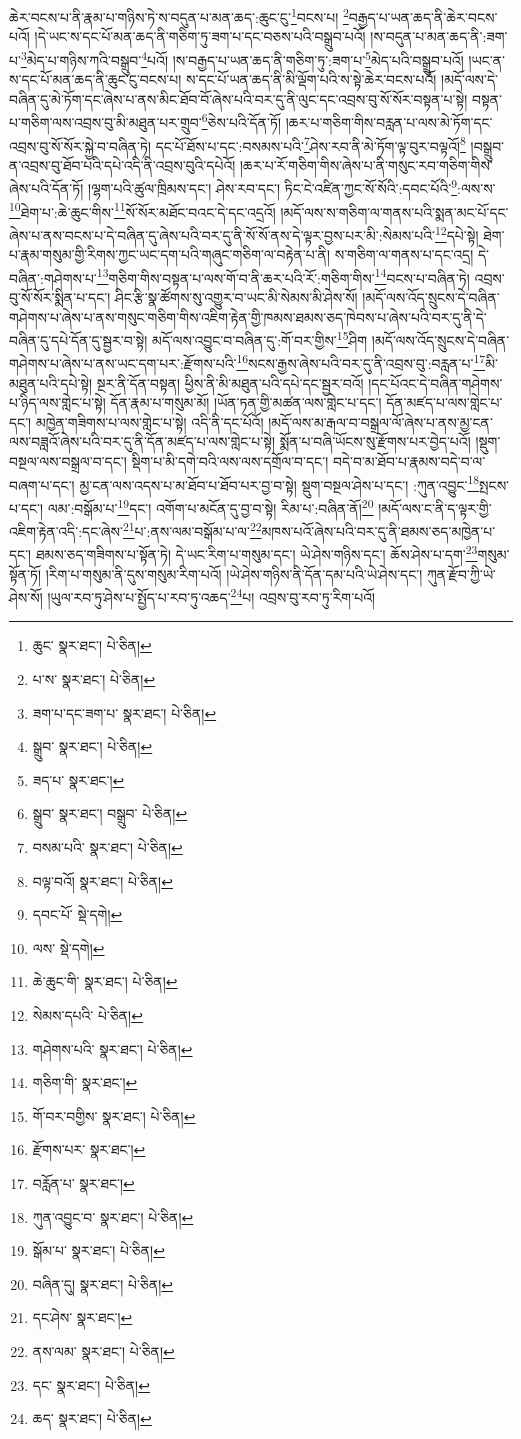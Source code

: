 ཆེར་བངས་པ་ནི་རྣམ་པ་གཉིས་ཏེ་ས་བདུན་པ་མན་ཆད་:ཆུང་ངུ་\footnote{ཆུང་  སྣར་ཐང་།  པེ་ཅིན། }བངས་པ། \footnote{པ་ས་  སྣར་ཐང་།  པེ་ཅིན། }བརྒྱད་པ་ཡན་ཆད་ནི་ཆེར་བངས་པའོ། །དེ་ཡང་ས་དང་པོ་མན་ཆད་ནི་གཅིག་ཏུ་ཟག་པ་དང་བཅས་པའི་བསྒྲུབ་པའོ། །ས་བདུན་པ་མན་ཆད་ནི་:ཟག་པ་\footnote{ཟག་པ་དང་ཟག་པ་  སྣར་ཐང་།  པེ་ཅིན། }མེད་པ་གཉིས་ཀའི་བསྒྲུབ་\footnote{སྒྲུབ་  སྣར་ཐང་།  པེ་ཅིན། }པའོ། །ས་བརྒྱད་པ་ཡན་ཆད་ནི་གཅིག་ཏུ་:ཟག་པ་\footnote{ཟད་པ་  སྣར་ཐང་། }མེད་པའི་བསྒྲུབ་པའོ། །ཡང་ན་ས་དང་པོ་མན་ཆད་ནི་ཆུང་ངུ་བངས་པ། ས་དང་པོ་ཡན་ཆད་ནི་མི་ལྡོག་པའི་ས་སྟེ་ཆེར་བངས་པའོ། །མདོ་ལས་དེ་བཞིན་དུ་མེ་ཏོག་དང་ཞེས་པ་ནས་མིང་ཐོབ་བོ་ཞེས་པའི་བར་དུ་ནི་ལུང་དང་འབྲས་བུ་སོ་སོར་བསྟན་པ་སྟེ། བསྟན་པ་གཅིག་ལས་འབྲས་བུ་མི་མཐུན་པར་གྲུབ་\footnote{སྒྲུབ་  སྣར་ཐང་། བསྒྲུབ་  པེ་ཅིན། }ཅེས་པའི་དོན་ཏོ། །ཆར་པ་གཅིག་གིས་བརླན་པ་ལས་མེ་ཏོག་དང་འབྲས་བུ་སོ་སོར་སྐྱེ་བ་བཞིན་ཏེ། དང་པོ་ཐོས་པ་དང་:བསམས་པའི་\footnote{བསམ་པའི་  སྣར་ཐང་།  པེ་ཅིན། }ཤེས་རབ་ནི་མེ་ཏོག་ལྟ་བུར་བལྟའོ།\footnote{བལྟ་བའོ།  སྣར་ཐང་།  པེ་ཅིན། } །བསྒྲུབ་ན་འབྲས་བུ་ཐོབ་པའི་དཔེ་འདི་ནི་འབྲས་བུའི་དཔེའོ། །ཆར་པ་རོ་གཅིག་གིས་ཞེས་པ་ནི་གསུང་རབ་གཅིག་གིས་ཞེས་པའི་དོན་ཏོ། །ལྷག་པའི་ཚུལ་ཁྲིམས་དང་། ཤེས་རབ་དང་། ཏིང་ངེ་འཛིན་ཀྱང་སོ་སོའི་:དབང་པོའི་\footnote{དབང་པོ་  སྡེ་དགེ། }:ལས་ས་\footnote{ལས་  སྡེ་དགེ། }ཐེག་པ་:ཆེ་ཆུང་གིས་\footnote{ཆེ་ཆུང་གི་  སྣར་ཐང་།  པེ་ཅིན། }སོ་སོར་མཐོང་བའང་དེ་དང་འདྲའོ། །མདོ་ལས་ས་གཅིག་ལ་གནས་པའི་སྨན་མང་པོ་དང་ཞེས་པ་ནས་བངས་པ་དེ་བཞིན་དུ་ཞེས་པའི་བར་དུ་ནི་སོ་སོ་ནས་དེ་ལྟར་བྱས་པར་མི་:སེམས་པའི་\footnote{སེམས་དཔའི་  པེ་ཅིན། }དཔེ་སྟེ། ཐེག་པ་རྣམ་གསུམ་གྱི་རིགས་ཀྱང་ཡང་དག་པའི་གཞུང་གཅིག་ལ་བརྟེན་པ་ནི། ས་གཅིག་ལ་གནས་པ་དང་འདྲ། དེ་བཞིན་:གཤེགས་པ་\footnote{གཤེགས་པའི་  སྣར་ཐང་།  པེ་ཅིན། }གཅིག་གིས་བསྟན་པ་ལས་གོ་བ་ནི་ཆར་པའི་རོ་:གཅིག་གིས་\footnote{གཅིག་གི་  སྣར་ཐང་། }བངས་པ་བཞིན་ཏེ། འབྲས་བུ་སོ་སོར་སྨིན་པ་དང་། ཤིང་རྩི་སྣ་ཚོགས་སུ་འགྱུར་བ་ཡང་མི་སེམས་མི་ཤེས་སོ། །མདོ་ལས་འོད་སྲུངས་དེ་བཞིན་གཤེགས་པ་ཞེས་པ་ནས་གསུང་གཅིག་གིས་འཇིག་རྟེན་གྱི་ཁམས་ཐམས་ཅད་ཁེབས་པ་ཞེས་པའི་བར་དུ་ནི་དེ་བཞིན་དུ་དཔེ་དོན་དུ་སྦྱར་བ་སྟེ། མདོ་ལས་འབྱུང་བ་བཞིན་དུ་:གོ་བར་གྱིས་\footnote{གོ་བར་བགྱིས་  སྣར་ཐང་།  པེ་ཅིན། }ཤིག །མདོ་ལས་འོད་སྲུངས་དེ་བཞིན་གཤེགས་པ་ཞེས་པ་ནས་ཡང་དག་པར་:རྫོགས་པའི་\footnote{རྫོགས་པར་  སྣར་ཐང་། }སངས་རྒྱས་ཞེས་པའི་བར་དུ་ནི་འབྲས་བུ་:བརླན་པ་\footnote{བརློན་པ་  སྣར་ཐང་། }མི་མཐུན་པའི་དཔེ་སྟེ། སྔར་ནི་དོན་བསྟན། ཕྱིས་ནི་མི་མཐུན་པའི་དཔེ་དང་སྦྱར་བའོ། །དང་པོའང་དེ་བཞིན་གཤེགས་པ་ཉིད་ལས་གླེང་པ་སྟེ། དོན་རྣམ་པ་གསུམ་མོ། །ཡོན་ཏན་གྱི་མཚན་ལས་གླེང་པ་དང་། དོན་མཛད་པ་ལས་གླེང་པ་དང་། མཁྱེན་གཟིགས་པ་ལས་གླེང་པ་སྟེ། འདི་ནི་དང་པོའོ། །མདོ་ལས་མ་རྒལ་བ་བསྒྲལ་ལོ་ཞེས་པ་ནས་མྱ་ངན་ལས་བཟླའོ་ཞེས་པའི་བར་དུ་ནི་དོན་མཛད་པ་ལས་གླེང་པ་སྟེ། སྨོན་པ་བཞི་ཡོངས་སུ་རྫོགས་པར་བྱེད་པའོ། །སྡུག་བསྔལ་ལས་བསྒྲལ་བ་དང་། སྡིག་པ་མི་དགེ་བའི་ལས་ལས་དགྲོལ་བ་དང་། བདེ་བ་མ་ཐོབ་པ་རྣམས་བདེ་བ་ལ་བཞག་པ་དང་། མྱ་ངན་ལས་འདས་པ་མ་ཐོབ་པ་ཐོབ་པར་བྱ་བ་སྟེ། སྡུག་བསྔལ་ཤེས་པ་དང་། :ཀུན་འབྱུང་\footnote{ཀུན་འབྱུང་བ་  སྣར་ཐང་།  པེ་ཅིན། }སྤངས་པ་དང་། ལམ་:བསྒོམ་པ་\footnote{སྒོམ་པ་  སྣར་ཐང་།  པེ་ཅིན། }དང་། འགོག་པ་མངོན་དུ་བྱ་བ་སྟེ། རིམ་པ་:བཞིན་ནོ།\footnote{བཞིན་དུ།  སྣར་ཐང་།  པེ་ཅིན། } །མདོ་ལས་ང་ནི་ད་ལྟར་གྱི་འཇིག་རྟེན་འདི་:དང་ཞེས་\footnote{དང་ཤེས་  སྣར་ཐང་། }པ་:ནས་ལམ་བསྒོམ་པ་ལ་\footnote{ནས་ལམ་  སྣར་ཐང་།  པེ་ཅིན། }མཁས་པའོ་ཞེས་པའི་བར་དུ་ནི་ཐམས་ཅད་མཁྱེན་པ་དང་། ཐམས་ཅད་གཟིགས་པ་སྟོན་ཏེ། དེ་ཡང་རིག་པ་གསུམ་དང་། ཡེ་ཤེས་གཉིས་དང་། ཆོས་ཤེས་པ་དག་\footnote{དང་  སྣར་ཐང་།  པེ་ཅིན། }གསུམ་སྟོན་ཏོ། །རིག་པ་གསུམ་ནི་དུས་གསུམ་རིག་པའོ། །ཡེ་ཤེས་གཉིས་ནི་དོན་དམ་པའི་ཡེ་ཤེས་དང་། ཀུན་རྫོབ་ཀྱི་ཡེ་ཤེས་སོ། །ཡུལ་རབ་ཏུ་ཤེས་པ་སྤྱོད་པ་རབ་ཏུ་འཆད་\footnote{ཆད་  སྣར་ཐང་།  པེ་ཅིན། }པ། འབྲས་བུ་རབ་ཏུ་རིག་པའོ། 